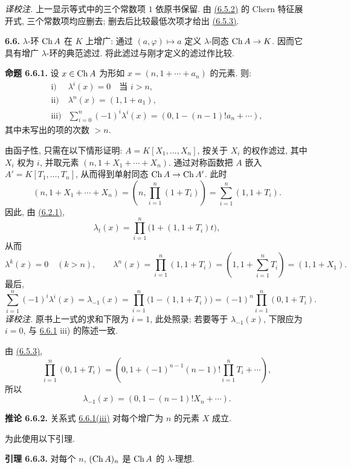 \emph{译校注.} 上一显示等式中的三个常数项 \(1\) 依原书保留. 由 \hyperlink{sga6.e05.eq.6-5-2}{(6.5.2)} 的 Chern 特征展开式, 三个常数项均应删去; 删去后比较最低次项才给出 \hyperlink{sga6.e05.eq.6-5-3}{(6.5.3)}.

\textbf{6.6.} \(\lambda\)-环 \(\operatorname{Ch} A\) 在 \(K\) 上增广: 通过 \((a,\varphi)\mapsto a\) 定义 \(\lambda\)-同态 \(\operatorname{Ch} A\to K\). 因而它具有增广 \(\lambda\)-环的典范滤过. 将此滤过与刚才定义的滤过作比较.

\textbf{命题 6.6.1.} 设 \(x\in\operatorname{Ch} A\) 为形如 \(x=(n,1+\cdots+a_n)\) 的元素. 则:
\[
\begin{array}{ll}
\text{i)}& \lambda^i(x)=0\quad\text{当 }i>n,\\[0.3em]
\text{ii)}& \lambda^n(x)=(1,1+a_1),\\[0.3em]
\text{iii)}& \displaystyle\sum_{i=0}^n(-1)^i\lambda^i(x)
       =(0,1-(n-1)!a_n+\cdots),
\end{array}
\]
其中未写出的项的次数 \(>n\).

由函子性, 只需在以下情形证明:
\(A=K[X_1,\ldots,X_n]\), 按关于 \(X_i\) 的权作滤过, 其中 \(X_i\) 权为 \(i\), 并取元素 \((n,1+X_1+\cdots+X_n)\). 通过对称函数把 \(A\) 嵌入 \(A'=K[T_1,\ldots,T_n]\), 从而得到单射同态 \(\operatorname{Ch} A\to\operatorname{Ch} A'\). 此时
\[
 (n,1+X_1+\cdots+X_n)
 =
 \left(n,\prod_{i=1}^n(1+T_i)\right)
 =
 \sum_{i=1}^n(1,1+T_i).
\]
因此, 由 \hyperlink{sga6.e05.eq.6-2-1}{(6.2.1)},
\[
  \lambda_t(x)=\prod_{i=1}^n\bigl(1+(1,1+T_i)t\bigr),
\]
从而
\[
  \lambda^k(x)=0\quad(k>n),\qquad
  \lambda^n(x)=\prod_{i=1}^n(1,1+T_i)
   =\left(1,1+\sum_{i=1}^nT_i\right)=(1,1+X_1).
\]
最后,
\[
  \sum_{i=1}^n(-1)^i\lambda^i(x)=\lambda_{-1}(x)
  =\prod_{i=1}^n\bigl(1-(1,1+T_i)\bigr)
  =(-1)^n\prod_{i=1}^n(0,1+T_i).
\]
\emph{译校注.} 原书上一式的求和下限为 \(i=1\), 此处照录; 若要等于 \(\lambda_{-1}(x)\), 下限应为 \(i=0\), 与 \hyperlink{sga6.e05.prop.6-6-1}{6.6.1} iii) 的陈述一致.

由 \hyperlink{sga6.e05.eq.6-5-3}{(6.5.3)},
\[
  \prod_{i=1}^n(0,1+T_i)
  =
  \left(0,1+(-1)^{n-1}(n-1)!\prod_{i=1}^nT_i+\cdots\right),
\]
所以
\[
  \lambda_{-1}(x)=(0,1-(n-1)!X_n+\cdots).
\]

\textbf{推论 6.6.2.} 关系式 \hyperlink{sga6.e05.prop.6-6-1}{6.6.1(iii)} 对每个增广为 \(n\) 的元素 \(X\) 成立.

为此使用以下引理.

\textbf{引理 6.6.3.} 对每个 \(n\), \((\operatorname{Ch} A)_n\) 是 \(\operatorname{Ch} A\) 的 \(\lambda\)-理想.

